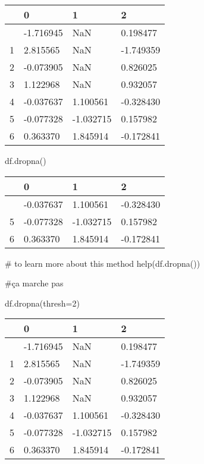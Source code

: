 \documentclass[
  letterpaper,
  DIV=11,
  numbers=noendperiod]{scrreprt}
\newenvironment{Shaded}{\begin{snugshade}}{\end{snugshade}}
\newcommand{\BuiltInTok}[1]{\textcolor[rgb]{0.00,0.23,0.31}{#1}}
\newcommand{\CommentTok}[1]{\textcolor[rgb]{0.37,0.37,0.37}{#1}}
\newcommand{\DecValTok}[1]{\textcolor[rgb]{0.68,0.00,0.00}{#1}}
\newcommand{\NormalTok}[1]{\textcolor[rgb]{0.00,0.23,0.31}{#1}}
\newcommand{\OperatorTok}[1]{\textcolor[rgb]{0.37,0.37,0.37}{#1}}
\begin{document}
\begin{longtable}[]{@{}llll@{}}
\toprule\noalign{}
& 0 & 1 & 2 \\
\midrule\noalign{}
\endhead
\bottomrule\noalign{}
\endlastfoot
0 & -1.716945 & NaN & 0.198477 \\
1 & 2.815565 & NaN & -1.749359 \\
2 & -0.073905 & NaN & 0.826025 \\
3 & 1.122968 & NaN & 0.932057 \\
4 & -0.037637 & 1.100561 & -0.328430 \\
5 & -0.077328 & -1.032715 & 0.157982 \\
6 & 0.363370 & 1.845914 & -0.172841 \\
\end{longtable}

\begin{Shaded}
\begin{Highlighting}[]
\NormalTok{df.dropna()}
\end{Highlighting}
\end{Shaded}

\begin{longtable}[]{@{}llll@{}}
\toprule\noalign{}
& 0 & 1 & 2 \\
\midrule\noalign{}
\endhead
\bottomrule\noalign{}
\endlastfoot
4 & -0.037637 & 1.100561 & -0.328430 \\
5 & -0.077328 & -1.032715 & 0.157982 \\
6 & 0.363370 & 1.845914 & -0.172841 \\
\end{longtable}

\begin{Shaded}
\begin{Highlighting}[]
\CommentTok{\# to learn more about this method}
\BuiltInTok{help}\NormalTok{(df.dropna())}
\end{Highlighting}
\end{Shaded}

\begin{Shaded}
\begin{Highlighting}[]
\CommentTok{\#ça marche pas}

\NormalTok{df.dropna(thresh}\OperatorTok{=}\DecValTok{2}\NormalTok{)}
\end{Highlighting}
\end{Shaded}

\begin{longtable}[]{@{}llll@{}}
\toprule\noalign{}
& 0 & 1 & 2 \\
\midrule\noalign{}
\endhead
\bottomrule\noalign{}
\endlastfoot
0 & -1.716945 & NaN & 0.198477 \\
1 & 2.815565 & NaN & -1.749359 \\
2 & -0.073905 & NaN & 0.826025 \\
3 & 1.122968 & NaN & 0.932057 \\
4 & -0.037637 & 1.100561 & -0.328430 \\
5 & -0.077328 & -1.032715 & 0.157982 \\
6 & 0.363370 & 1.845914 & -0.172841 \\
\end{longtable}
\end{document}
